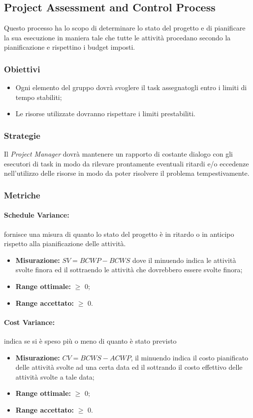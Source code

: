 	\subsection{Project Assessment and Control Process}
		Questo processo ha lo scopo di determinare lo stato del progetto e di pianificare la sua esecuzione in maniera tale che tutte le attività procedano secondo la pianificazione e rispettino i budget imposti.
		\subsubsection{Obiettivi}
			\begin{itemize}
				\item Ogni elemento del gruppo dovrà svoglere il task assegnatogli entro i limiti di tempo stabiliti;
				\item Le risorse utilizzate dovranno rispettare i limiti prestabiliti.
			\end{itemize}
	\subsubsection{Strategie}
	Il \textit{Project Manager} dovrà mantenere un rapporto di costante dialogo con gli esecutori di task in modo da rilevare prontamente eventuali ritardi e/o eccedenze nell'utilizzo delle risorse in modo da poter risolvere il problema tempestivamente.
	\subsubsection{Metriche}
		\paragraph{Schedule Variance:}
		fornisce una misura di quanto lo stato del progetto è in ritardo o in anticipo rispetto alla pianificazione delle attività.
		\begin{itemize}
			\item  \textbf{Misurazione: }$SV = BCWP - BCWS$ dove il minuendo indica le attività svolte finora ed il sottraendo le attività che dovrebbero essere svolte finora;
			\item \textbf{Range ottimale: }$\geq$ 0;
			\item \textbf{Range accettato: }$\geq$ 0.
		\end{itemize}
		\paragraph{Cost Variance:}
		indica se si è speso più o meno di quanto è stato previsto
		\begin{itemize}
			\item \textbf{Misurazione: }$CV = BCWS - ACWP$, il minuendo indica il costo pianificato delle attività svolte ad una certa data ed il sottrando il costo effettivo delle attività svolte a tale data;
			\item \textbf{Range ottimale: }$\geq$ 0;
			\item \textbf{Range accettato: }$\geq$ 0.
		\end{itemize}

